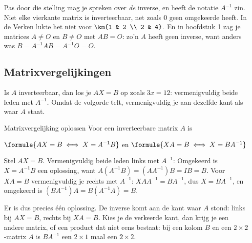 Pas door die stelling mag je spreken over \textit{de} inverse, en heeft de notatie $A^{-1}$ zin. Niet elke vierkante matrix is inverteerbaar, net zoals 0 geen omgekeerde heeft. In de Verken lukte het niet voor $\km{1 & 2 \\ 2 & 4}$. En in hoofdstuk 1 zag je matrices $A \neq O$ en $B \neq O$ met $AB = O$: zo'n $A$ heeft geen inverse, want anders was $B = A^{-1}AB = A^{-1}O = O$.

\begin{oefeningen}
\end{oefeningen}

\subsection{Matrixvergelijkingen}

Is $A$ inverteerbaar, dan los je $AX = B$ op zoals $3x = 12$: vermenigvuldig beide leden met $A^{-1}$. Omdat de volgorde telt, vermenigvuldig je aan dezelfde kant als waar $A$ staat.

\begin{theorie}
\begin{stelling}{Matrixvergelijking oplossen}
Voor een inverteerbare matrix $A$ is

\vspace{1mm}
\qquad $\formule{AX = B \iff X = A^{-1}B}$ \qquad en \qquad $\formule{XA = B \iff X = BA^{-1}}$
\end{stelling}

\begin{bewijs}
Stel $AX = B$. Vermenigvuldig beide leden links met $A^{-1}$:
Omgekeerd is $X = A^{-1}B$ een oplossing, want $A(A^{-1}B) = (AA^{-1})B = IB = B$. Voor $XA = B$ vermenigvuldig je rechts met $A^{-1}$: $XAA^{-1} = BA^{-1}$, dus $X = BA^{-1}$, en omgekeerd is $(BA^{-1})A = B(A^{-1}A) = B$.
\end{bewijs}
\end{theorie}

Er is dus precies één oplossing. De inverse komt aan de kant waar $A$ stond: links bij $AX = B$, rechts bij $XA = B$. Kies je de verkeerde kant, dan krijg je een andere matrix, of een product dat niet eens bestaat: bij een kolom $B$ en een $2 \times 2$-matrix $A$ is $BA^{-1}$ een $2 \times 1$ maal een $2 \times 2$.

